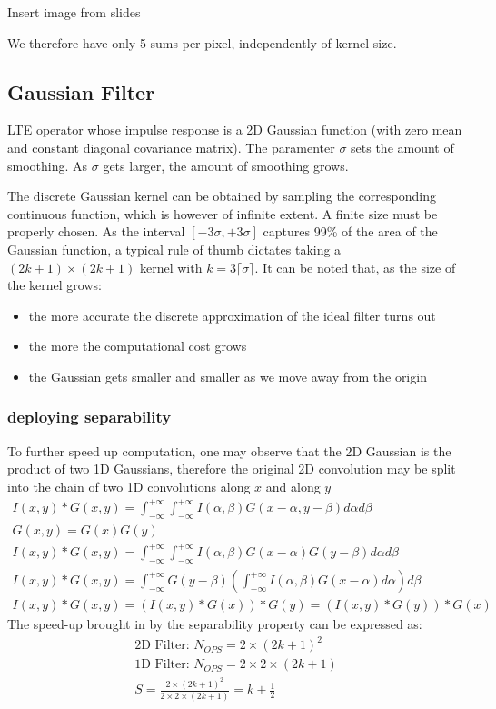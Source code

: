 \documentclass{article}
\begin{document}
Insert image from slides

We therefore have only 5 sums per pixel, independently of kernel size.

\subsection{Gaussian Filter}
LTE operator whose impulse response is a 2D Gaussian function (with zero mean and constant diagonal covariance matrix). The paramenter $\sigma$ sets the amount of smoothing. As $\sigma$ gets larger, the amount of smoothing grows.

The discrete Gaussian kernel can be obtained by sampling the corresponding continuous function, which is however of infinite extent. A finite size must be properly chosen. As the interval $[-3\sigma, +3\sigma]$ captures 99\% of the area of the Gaussian function, a typical rule of thumb dictates taking a $(2k+1)\times(2k+1)$ kernel with $k=3\lceil \sigma \rceil$.
It can be noted that, as the size of the kernel grows:
\begin{itemize}
    \item the more accurate the discrete approximation of the ideal filter turns out
    \item the more the computational cost grows
    \item the Gaussian gets smaller and smaller as we move away from the origin
\end{itemize}
\subsubsection{deploying separability}
To further speed up computation, one may observe that the 2D Gaussian is the product of two 1D Gaussians, therefore the original 2D convolution may be split into the chain of two 1D convolutions along $x$ and along $y$
\begin{gather}
    I(x,y) \ast G(x,y) = \int_{-\infty}^{+\infty}\int_{-\infty}^{+\infty}I(\alpha,\beta)G(x-\alpha,y-\beta)d\alpha d\beta\\
    G(x,y)=G(x)G(y)\\
    I(x,y)\ast G(x,y) = \int_{-\infty}^{+\infty}\int_{-\infty}^{+\infty} I(\alpha,\beta)G(x-\alpha)G(y-\beta)d\alpha d\beta\\
    I(x,y)\ast G(x,y) = \int_{-\infty}^{+\infty}G(y-\beta)\left(\int_{-\infty}^{+\infty} I(\alpha,\beta)G(x-\alpha)d\alpha \right) d\beta\\
    I(x,y)\ast G(x,y) = (I(x,y)\ast G(x))\ast G(y) = (I(x,y) \ast G(y)) \ast G(x)
\end{gather}
The speed-up brought in by the separability property can be expressed as:
\begin{gather}
    \text{2D Filter: } N_{OPS} = 2\times(2k+1)^2\\
    \text{1D Filter: } N_{OPS} = 2\times2\times(2k+1)\\
    S=\frac{2\times(2k+1)^2}{ 2\times2\times(2k+1) } = k+ \frac{1}{2}
\end{gather}
\end{document}
